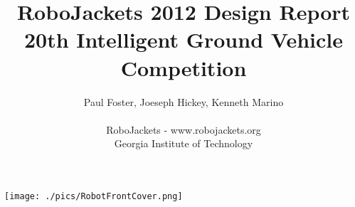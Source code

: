 \documentclass[letterpaper,12pt]{article}
\title{RoboJackets 2012 Design Report\\\large{20th Intelligent Ground Vehicle Competition}}
\author{
Paul Foster, Joeseph Hickey, Kenneth Marino
\\
\\
RoboJackets - www.robojackets.org
\\
Georgia Institute of Technology
}
\date{}
\begin{document}
\maketitle
\thispagestyle{empty}
\begin{center}
\texttt{[image: ./pics/RobotFrontCover.png]}
\end{center}

%

\newpage
\setcounter{tocdepth}{2}
\tableofcontents

\newpage
\listoffigures
\listoftables

\newpage


%









\newpage


%
\end{document}
